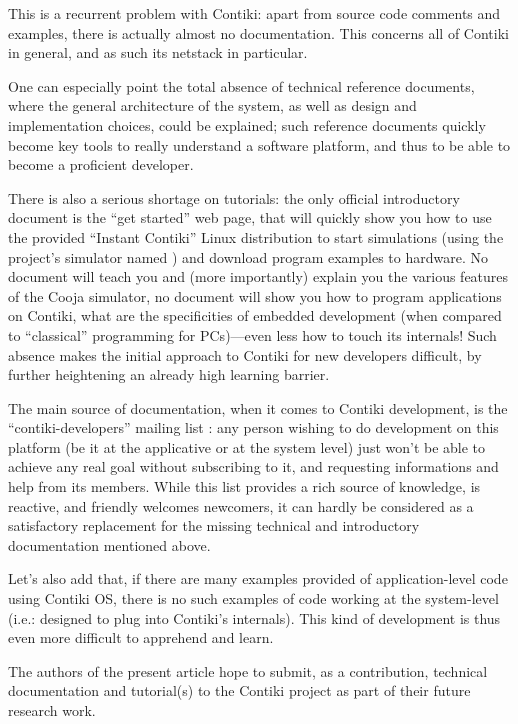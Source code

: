 \documentclass[12pt,a4paper]{article}
\begin{document}
This is a recurrent problem with Contiki: apart from source code comments
and examples, there is actually almost no documentation. This concerns
all of Contiki in general, and as such its netstack in particular.

One can especially point the total absence of technical reference documents,
where the general architecture of the system, as well as design and
implementation choices, could be explained; such reference documents
quickly become key tools to really understand a software platform,
and thus to be able to become a proficient developer.

There is also a serious shortage on tutorials: the only official introductory
document is the ``get started'' web page, that will quickly show you how to
use the provided ``Instant Contiki'' Linux distribution to start simulations
(using the project's simulator named  \cite{cooja}) and download
program examples to hardware. No document will teach you and (more
importantly) explain you the various features of the Cooja simulator,
no document will show you how to program applications on Contiki, what are
the specificities of embedded development (when compared to ``classical''
programming for PCs)---even less how to touch its internals!
Such absence makes the initial approach to Contiki for new developers
difficult, by further heightening an already high learning barrier.

The main source of documentation, when it comes to Contiki development,
is the ``contiki-developers'' mailing list \cite{contiki-dev-ml}: any person
wishing to do development on this platform (be it at the applicative or at
the system level) just won't be able to achieve any real goal without
subscribing to it, and requesting informations and help from its members.
While this list provides a rich source of knowledge, is reactive, and
friendly welcomes newcomers, it can hardly be considered as a satisfactory
replacement for the missing technical and introductory documentation
mentioned above.

Let's also add that, if there are many examples provided of application-level
code using Contiki OS, there is no such examples of code working at the
system-level (i.e.: designed to plug into Contiki's internals). This kind
of development is thus even more difficult to apprehend and learn.

The authors of the present article hope to submit, as a contribution,
technical documentation and tutorial(s) to the Contiki project as part
of their future research work.
\end{document}
